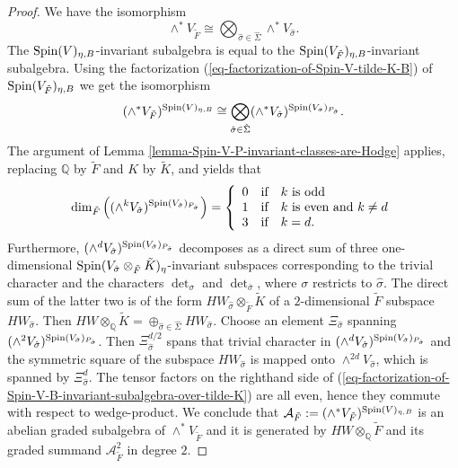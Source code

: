 \documentclass[12pt]{amsart}
\numberwithin{equation}{subsection}
\theoremstyle{plain}
\theoremstyle{definition}
\newcommand{\A}{{\mathcal A}}
\newcommand{\QQ}{{\mathbb Q}}
\newcommand{\Spin}{{\rm Spin}}
\begin{document}
{\begin{proof}
We have the isomorphism
\[
\wedge^*V_{\tilde{F}}\cong \bigotimes_{\hat{\sigma}\in\hat{\Sigma}}
\wedge^*V_{\hat{\sigma}}.
\]
The $\Spin(V)_{\eta,B}$-invariant subalgebra is equal to the $\Spin(V_{\tilde{F}})_{\eta,B}$-invariant subalgebra. Using the factorization 
(\ref{eq-factorization-of-Spin-V-tilde-K-B}) of $\Spin(V_{\tilde{F}})_{\eta,B}$ we get the isomorphism
\begin{equation}
\label{eq-factorization-of-Spin-V-B-invariant-subalgebra-over-tilde-K}
(\wedge^*V_{\tilde{F}})^{\Spin(V)_{\eta,B}}\cong
\bigotimes_{\hat{\sigma}\in\hat{\Sigma}}
(\wedge^*V_{\hat{\sigma}})^{\Spin(V_{\hat{\sigma}})_{P_{\hat{\sigma}}}}.
\end{equation}
The argument of Lemma \ref{lemma-Spin-V-P-invariant-classes-are-Hodge} applies, replacing $\QQ$ by $\tilde{F}$ and $K$ by $\tilde{K}$, and yields that 
\[
\dim_{\tilde{F}}\left((\wedge^kV_{\hat{\sigma}})^{\Spin(V_{\hat{\sigma}})_{P_{\hat{\sigma}}}}\right)=
\left\{
\begin{array}{ccl}
0&\mbox{if}&k \ \mbox{is odd}
\\
1&\mbox{if} & k \ \mbox{is even and} \ k\neq d
\\
3&\mbox{if}& k=d.
\end{array}
\right.
\]
Furthermore, $(\wedge^dV_{\hat{\sigma}})^{\Spin(V_{\hat{\sigma}})_{P_{\hat{\sigma}}}}$ decomposes as a direct sum of three one-dimensional   
$\Spin(V_{\hat{\sigma}}\otimes_{\tilde{F}}\tilde{K})_\eta$-invariant subspaces corresponding to the trivial character and the characters $\det_\sigma$ and $\det_{\bar{\sigma}}$, where $\sigma$ restricts to $\hat{\sigma}$. The direct sum of the latter two is of the form $HW_{\hat{\sigma}}\otimes_{\tilde{F}}\tilde{K}$
of a $2$-dimensional $\tilde{F}$ subspace $HW_{\hat{\sigma}}$. 
Then $HW\otimes_\QQ\tilde{K}=\oplus_{\hat{\sigma}\in\hat{\Sigma}}HW_{\hat{\sigma}}$.
Choose an element $\Xi_{\hat{\sigma}}$ spanning $(\wedge^2V_{\hat{\sigma}})^{\Spin(V_{\hat{\sigma}})_{P_{\hat{\sigma}}}}$. Then $\Xi_{\hat{\sigma}}^{d/2}$ spans that trivial character in $(\wedge^dV_{\hat{\sigma}})^{\Spin(V_{\hat{\sigma}})_{P_{\hat{\sigma}}}}$ and
the symmetric square of the subspace $HW_{\hat{\sigma}}$ is mapped onto $\wedge^{2d}V_{\hat{\sigma}}$, which is spanned by $\Xi_{\hat{\sigma}}^d$.
The tensor factors on the righthand side of (\ref{eq-factorization-of-Spin-V-B-invariant-subalgebra-over-tilde-K}) are all even, hence they commute with respect to wedge-product. We conclude that $\A_{\tilde{F}}:=(\wedge^*V_{\tilde{F}})^{\Spin(V)_{\eta,B}}$ is an abelian graded subalgebra of $\wedge^*V_{\tilde{F}}$ and it is generated by $HW\otimes_\QQ\tilde{F}$ and its graded summand $\A_{\tilde{F}}^2$ in degree $2$.


\end{proof}}
\end{document}
